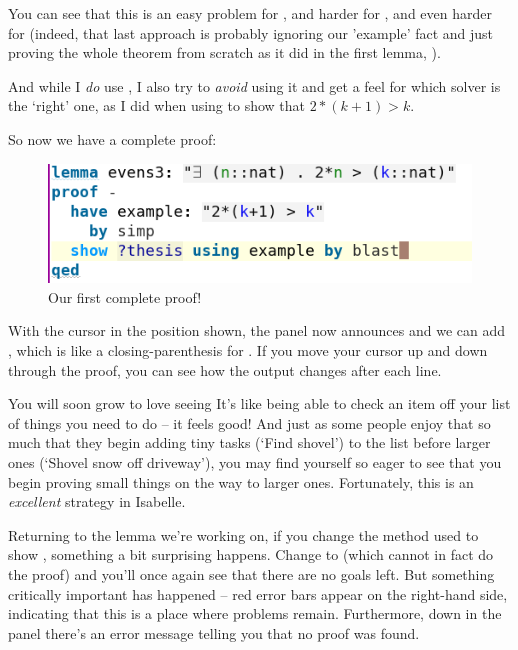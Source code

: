 You can see that this is an easy problem for , and harder for , and even harder for  (indeed, that last approach is probably ignoring our 'example' fact and just proving the whole theorem from scratch as it did in the first lemma, ).

And while I \textit{do} use , I also try to \textit{avoid} using it and get a feel for which solver is the `right' one, as I did when using  to show that $2*(k+1) > k.$ 

So now we have a complete proof:
\begin{figure}[h]
    \includegraphics[width=0.75\linewidth]{C01/Images/proof1.png}
    \caption{Our first complete proof!}
    \label{fig:first-proof}
\end{figure}

With the cursor in the position shown, the  panel now announces  and we can add , which is like a closing-parenthesis for . If you move your cursor up and down through the proof, you can see how the output changes after each line. 

You will soon grow to love seeing  It's like being able to check an item off your list of things you need to do -- it feels good! And just as some people enjoy that so much that they begin adding tiny tasks (`Find shovel') to the list before larger ones (`Shovel snow off driveway'), you may find yourself so eager to see  that you begin proving small things on the way to larger ones. Fortunately, this is an \textit{excellent} strategy in Isabelle. 

Returning to the lemma we're working on, if you change the method used to show , something a bit surprising happens. Change  to  (which cannot in fact do the proof) and you'll once again see that there are no goals left. But something critically important has happened -- red error bars appear on the right-hand side, indicating that this is a place where problems remain. Furthermore, down in the  panel there's an error message telling you that no proof was found. 

